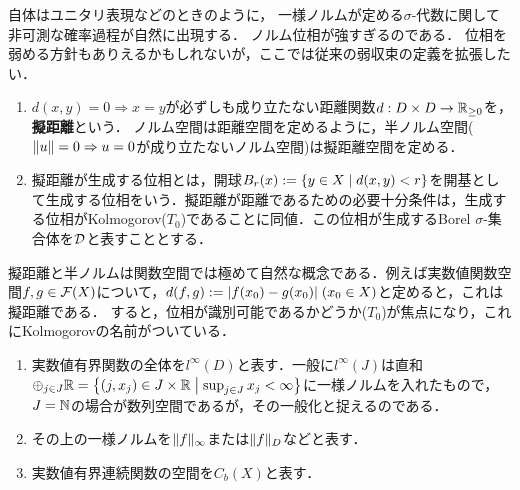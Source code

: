 \documentclass[uplatex,dvipdfmx]{jsreport}
\begin{document}
\begin{tcolorbox}[colframe=ForestGreen, colback=ForestGreen!10!white,breakable,colbacktitle=ForestGreen!40!white,coltitle=black,fonttitle=\bfseries\sffamily,
title=]
    自体はユニタリ表現などのときのように，
    一様ノルムが定める$\sigma$-代数に関して非可測な確率過程が自然に出現する．
    ノルム位相が強すぎるのである．
    位相を弱める方針もありえるかもしれないが，ここでは従来の弱収束の定義を拡張したい．
\end{tcolorbox}

\begin{definition}[pseudometric]\mbox{}
    \begin{enumerate}
        \item $d(x,y)=0\Rightarrow x=y$が必ずしも成り立たない距離関数$d:D\times D\to\mathbb{R}_{\ge 0}$を，\textbf{擬距離}という．
        ノルム空間は距離空間を定めるように，半ノルム空間($\|u\|=0\Rightarrow u=0$が成り立たないノルム空間)は擬距離空間を定める．
        \item 擬距離が生成する位相とは，開球$B_r(x):=\left\{y\in X\mid d(x,y)< r\right\}$を開基として生成する位相をいう．擬距離が距離であるための必要十分条件は，生成する位相がKolmogorov($T_0$)であることに同値．この位相が生成するBorel $\sigma$-集合体を$\mathcal{D}$と表すこととする．
    \end{enumerate}
\end{definition}
\begin{remark}
    擬距離と半ノルムは関数空間では極めて自然な概念である．例えば実数値関数空間$f,g\in\mathcal{F}(X)$について，$d(f,g):=\lvert f(x_0)-g(x_0)\rvert\;(x_0\in X)$と定めると，これは擬距離である．
    すると，位相が識別可能であるかどうか($T_0$)が焦点になり，これにKolmogorovの名前がついている．
\end{remark}

\begin{notation}[関数空間の記法]\mbox{}
    \begin{enumerate}
        \item 実数値有界関数の全体を$l^\infty(D)$と表す．一般に$l^\infty(J)$は直和$\oplus_{j\in J}\mathbb{R}=\left\{(j,x_j)\in J\times\mathbb{R}\;\middle|\; \sup_{j\in J}x_j<\infty\right\}$に一様ノルムを入れたもので，$J=\mathbb{N}$の場合が数列空間であるが，その一般化と捉えるのである．
        \item その上の一様ノルムを$\|f\|_\infty$または$\|f\|_D$などと表す．
        \item 実数値有界連続関数の空間を$C_b(X)$と表す．
    \end{enumerate}
\end{notation}
\end{document}
